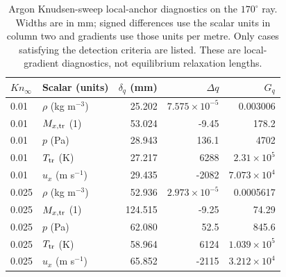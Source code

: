 \begin{table}
\centering\small
\caption{Argon Knudsen-sweep local-anchor diagnostics on the $170^\circ$ ray. Widths are in mm; signed differences use the scalar units in column two and gradients use those units per metre. Only cases satisfying the detection criteria are listed. These are local-gradient diagnostics, not equilibrium relaxation lengths.}\label{tab:ar_variable_scales_kn}
\begin{tabular}{llrrr}\toprule
$Kn_\infty$ & Scalar (units) & $\delta_q$ (mm) & $\Delta q$ & $G_q$\\\midrule
0.01 & $\rho$ (kg m$^{-3}$) & 25.202 & \(7.575\times10^{-5}\) & 0.003006\\
0.01 & $M_{x,\rm tr}$ (1) & 53.024 & -9.45 & 178.2\\
0.01 & $p$ (Pa) & 28.943 & 136.1 & 4702\\
0.01 & $T_{\rm tr}$ (K) & 27.217 & 6288 & \(2.31\times10^{5}\)\\
0.01 & $u_x$ (m s$^{-1}$) & 29.435 & -2082 & \(7.073\times10^{4}\)\\
0.025 & $\rho$ (kg m$^{-3}$) & 52.936 & \(2.973\times10^{-5}\) & 0.0005617\\
0.025 & $M_{x,\rm tr}$ (1) & 124.515 & -9.25 & 74.29\\
0.025 & $p$ (Pa) & 62.080 & 52.5 & 845.6\\
0.025 & $T_{\rm tr}$ (K) & 58.964 & 6124 & \(1.039\times10^{5}\)\\
0.025 & $u_x$ (m s$^{-1}$) & 65.852 & -2115 & \(3.212\times10^{4}\)\\
\bottomrule\end{tabular}
\end{table}

